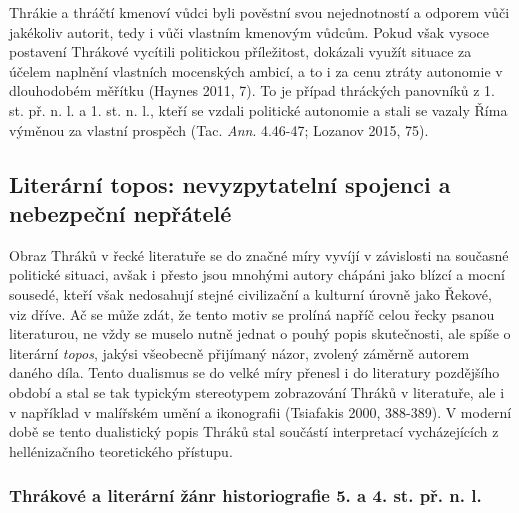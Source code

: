 Thrákie a thráčtí kmenoví vůdci byli pověstní svou nejednotností a odporem vůči jakékoliv autorit, tedy i vůči vlastním kmenovým vůdcům. Pokud však vysoce postavení Thrákové vycítili politickou příležitost, dokázali využít situace za účelem naplnění vlastních mocenských ambicí, a to i za cenu ztráty autonomie v dlouhodobém měřítku (Haynes 2011, 7). To je případ thráckých panovníků z 1. st. př. n. l. a 1. st. n. l., kteří se vzdali politické autonomie a stali se vazaly Říma výměnou za vlastní prospěch (Tac. {\em Ann}. 4.46-47; Lozanov 2015, 75).

\subsection[literární-topos-nevyzpytatelní-spojenci-a-nebezpeční-nepřátelé]{Literární topos: nevyzpytatelní spojenci a nebezpeční nepřátelé}

Obraz Thráků v řecké literatuře se do značné míry vyvíjí v závislosti na současné politické situaci, avšak i přesto jsou mnohými autory chápáni jako blízcí a mocní sousedé, kteří však nedosahují stejné civilizační a kulturní úrovně jako Řekové, viz dříve. Ač se může zdát, že tento motiv se prolíná napříč celou řecky psanou literaturou, ne vždy se muselo nutně jednat o pouhý popis skutečnosti, ale spíše o literární {\em topos}, jakýsi všeobecně přijímaný názor, zvolený záměrně autorem daného díla. Tento dualismus se do velké míry přenesl i do literatury pozdějšího období a stal se tak typickým stereotypem zobrazování Thráků v literatuře, ale i v například v malířském umění a ikonografii (Tsiafakis 2000, 388-389). V moderní době se tento dualistický popis Thráků stal součástí interpretací vycházejících z hellénizačního teoretického přístupu.

\subsubsection[thrákové-a-literární-žánr-historiografie-5.-a-4.-st.-př.-n.-l.]{Thrákové a literární žánr historiografie 5. a 4. st. př. n. l.}

